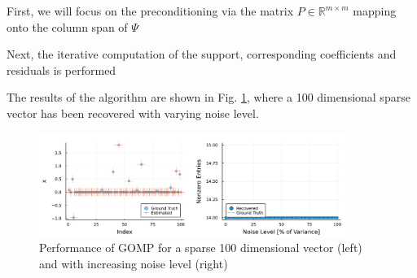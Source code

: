 

First, we will focus on the preconditioning via the matrix $P \in \mathbb{R}^{m \times m}$ mapping onto the
column span of $\Psi$



Next, the iterative computation of the support, corresponding coefficients and residuals is performed



The results of the algorithm are shown in Fig. \ref{JM:fig:GOMP}, where a 100 dimensional sparse vector has been recovered with varying noise level.

\begin{figure}
    \includegraphics[width = 0.9\textwidth]{../figures/merged.pdf}
    \caption{Performance of GOMP for a sparse 100 dimensional vector (left) and with increasing noise level (right)}
    \label{JM:fig:GOMP}
\end{figure}
